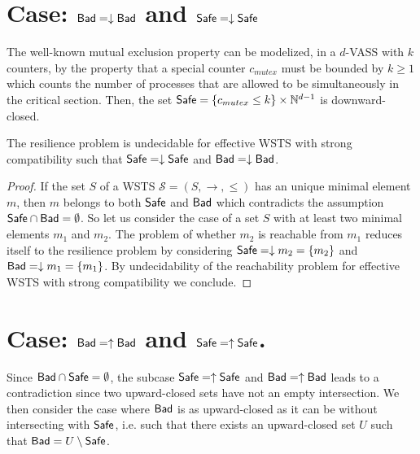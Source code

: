 

\section{Case: $\textsf{Bad}=\downarrow \textsf{Bad}$ and $\textsf{Safe}=\downarrow \textsf{Safe}$}\label{case down down}

The well-known mutual exclusion property can be modelized, in a $d$-VASS with $k$ counters, by the property that a special counter $c_{mutex}$ must be bounded by $k \geq 1$ which counts the number of processes that are allowed to be simultaneously in the critical section. Then, the set $\textsf{Safe} =  \{c_{mutex} \leq k\} \times \mathbb{N}^{d-1}$ is downward-closed.


\begin{theorem}\label{down-down}
The resilience problem is undecidable for  effective WSTS with  strong  compatibility such that
$\textsf{Safe}=\downarrow \textsf{Safe}$
and $\textsf{Bad}=\downarrow \textsf{Bad}$.
\end{theorem}

\begin{proof}
If the set $S$ of a WSTS $\mathscr{S}=(S,\rightarrow, \leq)$ has an unique minimal element $m$, then $m$ belongs to both $\textsf{Safe}$ and $\textsf{Bad}$ which contradicts the assumption $\textsf{Safe} \cap \textsf{Bad}= \emptyset$. So let us consider the case of a set $S$ with at least two minimal elements $m_1$ and $m_2$.
The problem of whether $m_2$ is reachable from $m_1$ reduces itself to the resilience problem by considering $\textsf{Safe}=\downarrow m_2 = \{ m_2\}$ and $\textsf{Bad}=\downarrow m_1 = \{ m_1\}$. By undecidability of the reachability problem for effective WSTS with strong compatibility we conclude.  
\end{proof}


\section{Case: $\textsf{Bad}=\uparrow \textsf{Bad}$ and $\textsf{Safe}=\uparrow \textsf{Safe}$.}\label{case up up}



Since $\textsf{Bad} \cap \textsf{Safe} = \emptyset$, the subcase $\textsf{Safe} = \uparrow \textsf{Safe}$ and $\textsf{Bad} = \uparrow \textsf{Bad}$ leads to a contradiction since two upward-closed sets have not an empty intersection. We then consider the case where $\textsf{Bad}$ is as upward-closed
as it can be without intersecting with $\textsf{Safe}$,
i.e. 
such that there exists an upward-closed set $U$
such that $\textsf{Bad} = U \setminus \textsf{Safe}$.

